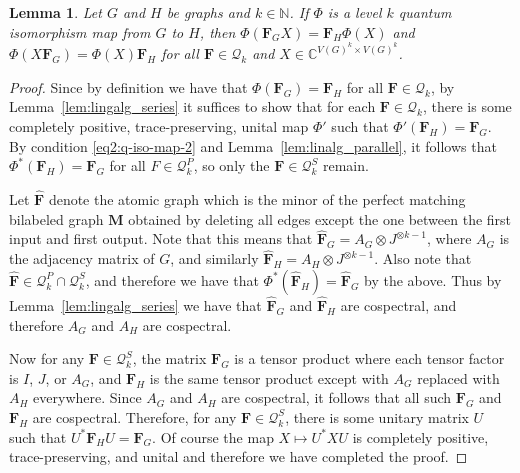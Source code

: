 \documentclass[a4paper,onecolumn,11pt,accepted=2026-01-06]{quantumarticle}
\theoremstyle{plain}
\newtheorem{lem}[thm]{Lemma}
\theoremstyle{remark}
\theoremstyle{definition}
\begin{document}
\begin{lem}\label{lem:multiplicative}
    Let $G$ and $H$ be graphs and $k \in \mathbb{N}$. If $\Phi$ is a level $k$ quantum isomorphism map from $G$ to $H$, then $\Phi(\boldsymbol{F}_GX) = \boldsymbol{F}_H\Phi(X)$ and $\Phi(X\boldsymbol{F}_G) = \Phi(X)\boldsymbol{F}_H$ for all $\boldsymbol{F} \in \mathcal{Q}_k$ and $X \in \mathbb{C}^{V(G)^k \times V(G)^k}$.
\end{lem}
\begin{proof}
    Since by definition we have that $\Phi(\boldsymbol{F}_G) = \boldsymbol{F}_H$ for all $\boldsymbol{F} \in \mathcal{Q}_k$, by Lemma~\ref{lem:lingalg_series} it suffices to show that for each $\boldsymbol{F} \in \mathcal{Q}_k$, there is some completely positive, trace-preserving, unital map $\Phi'$ such that $\Phi'(\boldsymbol{F}_H) = \boldsymbol{F}_G$. By condition \eqref{eq2:q-iso-map-2} and Lemma~\ref{lem:linalg_parallel}, it follows that $\Phi^*(\boldsymbol{F}_H) = \boldsymbol{F}_G$ for all $F \in \mathcal{Q}_k^P$, so only the $\boldsymbol{F} \in \mathcal{Q}_k^S$ remain.
    
    Let $\hat{\boldsymbol{F}}$ denote the atomic graph which is the minor of the perfect matching bilabeled graph $\mathbf{M}$ obtained by deleting all edges except the one between the first input and first output. Note that this means that $\hat{\boldsymbol{F}}_G = A_G \otimes J^{\otimes k-1}$, where $A_G$ is the adjacency matrix of $G$, and similarly $\hat{\boldsymbol{F}}_H = A_H \otimes J^{\otimes k-1}$. Also note that $\hat{\boldsymbol{F}} \in \mathcal{Q}_k^P \cap \mathcal{Q}_k^S$, and therefore we have that $\Phi^*(\hat{\boldsymbol{F}}_H) = \hat{\boldsymbol{F}}_G$ by the above. Thus by Lemma~\ref{lem:lingalg_series} we have that $\hat{\boldsymbol{F}}_G$ and $\hat{\boldsymbol{F}}_H$ are cospectral, and therefore $A_G$ and $A_H$ are cospectral.

    Now for any $\boldsymbol{F} \in \mathcal{Q}_k^S$, the matrix $\boldsymbol{F}_G$ is a tensor product where each tensor factor is $I$, $J$, or $A_G$, and $\boldsymbol{F}_H$ is the same tensor product except with $A_G$ replaced with $A_H$ everywhere. Since $A_G$ and $A_H$ are cospectral, it follows that all such $\boldsymbol{F}_G$ and $\boldsymbol{F}_H$ are cospectral. Therefore, for any $\boldsymbol{F} \in \mathcal{Q}_k^S$, there is some unitary matrix $U$ such that $U^* \boldsymbol{F}_H U = \boldsymbol{F}_G$. Of course the map $X \mapsto U^* X U$ is completely positive, trace-preserving, and unital and therefore we have completed the proof.
\end{proof}
\end{document}
